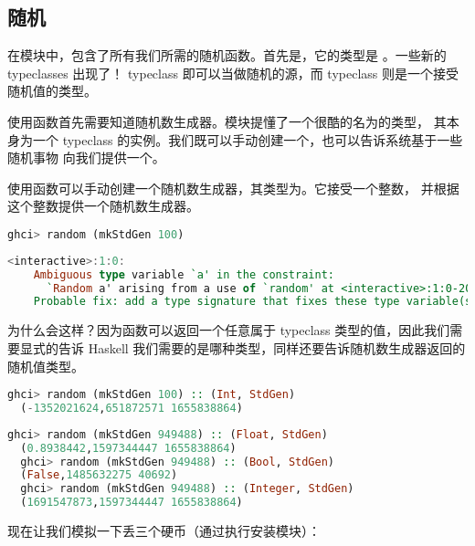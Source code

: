 \documentclass[./main.tex]{subfiles}
\begin{document}
\subsection*{随机}

在模块中，包含了所有我们所需的随机函数。首先是，它的类型是
。一些新的 typeclasses 出现了！
typeclass 即可以当做随机的源，而  typeclass 则是一个接受随机值的类型。

使用函数首先需要知道随机数生成器。模块提懂了一个很酷的名为的类型，
其本身为一个 typeclass 的实例。我们既可以手动创建一个，也可以告诉系统基于一些随机事物
向我们提供一个。

使用函数可以手动创建一个随机数生成器，其类型为。它接受一个整数，
并根据这个整数提供一个随机数生成器。

\begin{lstlisting}[language=Haskell]
  ghci> random (mkStdGen 100)
\end{lstlisting}

\begin{lstlisting}[language=Haskell]
  <interactive>:1:0:
    Ambiguous type variable `a' in the constraint:
      `Random a' arising from a use of `random' at <interactive>:1:0-20
    Probable fix: add a type signature that fixes these type variable(s)
\end{lstlisting}

为什么会这样？因为函数可以返回一个任意属于 typeclass 类型的值，因此我们需要显式的告诉
Haskell 我们需要的是哪种类型，同样还要告诉随机数生成器返回的随机值类型。

\begin{lstlisting}[language=Haskell]
  ghci> random (mkStdGen 100) :: (Int, StdGen)
  (-1352021624,651872571 1655838864)
\end{lstlisting}

\begin{lstlisting}[language=Haskell]
  ghci> random (mkStdGen 949488) :: (Float, StdGen)
  (0.8938442,1597344447 1655838864)
  ghci> random (mkStdGen 949488) :: (Bool, StdGen)
  (False,1485632275 40692)
  ghci> random (mkStdGen 949488) :: (Integer, StdGen)
  (1691547873,1597344447 1655838864)
\end{lstlisting}

现在让我们模拟一下丢三个硬币（通过执行安装模块）：
\end{document}
